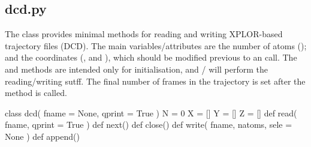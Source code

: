\normalsize
\subsection[dcd]{dcd.py}
The class  provides
minimal methods for reading and writing XPLOR-based trajectory files (DCD). The main variables/attributes are
the number of atoms (); and the coordinates (,  and ), which should
be modified previous to an  call. The  and  methods are intended
only for initialisation, and / will perform the reading/writing sutff.
The final number of frames in the trajectory is set after the  method is called.\\
\begin{pyglist}[language=python,fvset={frame=single}]
class dcd( fname = None, qprint = True )
    N = 0
    X = []
    Y = []
    Z = []
    def read( fname, qprint = True )
    def next()
    def close()
    def write( fname, natoms, sele = None )
    def append()
\end{pyglist}
